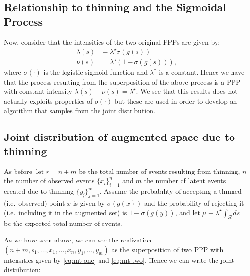 \documentclass{article}
\newcommand{\calR}{\mathcal{R}}
\newcommand{\sigmoid}{\sigma}
\begin{document}
	 \subsection{Relationship to thinning and the Sigmoidal Process}
	 Now, consider that the intensities of the two original \glspl{PPP} are given by:
	 \begin{align}
	 	\label{eq:int-one}
	 	\lambda(s) &= \lambda^{\star}  \sigmoid(g(s)) \\
	 	\label{eq:int-two}
	 	\nu(s) & = \lambda^{\star} (1-\sigmoid(g(s))) \text{,}	 
	 \end{align}
	 where $\sigmoid(\cdot)$ is the logistic sigmoid function and $\lambda^{*}$ is a constant. Hence we have that the process resulting from the superposition of the above process is a \gls{PPP} with constant intensity $\lambda(s) + \nu(s) = \lambda^{\star}$. We see that this results does not actually exploits properties of $\sigmoid(\cdot)$ but these are used in order to develop an algorithm that samples from the joint distribution. 
	 
	 
	 \subsection{Joint distribution of augmented space due to thinning}
	 As before, let $r = n + m$ be  the total number of events resulting from thinning, $n$ the number of observed events $\{x_i\}_{i=1}^n$ and $m$ the number of latent events  created due to thinning $\{ y_j \}_{j=1}^{m}$. 
	  Assume the probability of accepting a thinned (i.e.~observed) point $x$ is given by $\sigmoid(g(x))$ and the probability of rejecting it (i.e.~including it in the augmented set) is $1 - \sigmoid(g(y))$, and let $\mu \equiv \lambda^{\star} \int_{\calR} ds$ be the expected total number of events. 
	 
	 As we have seen above, we can see the realization $(n+m, s_1, \ldots, x_1, \ldots, x_n, y_1, \ldots, y_m )$ as the superposition of two \gls{PPP} with intensities given by  \cref{eq:int-one} and \cref{eq:int-two}. Hence we can write the joint distribution:
	 
\end{document}
